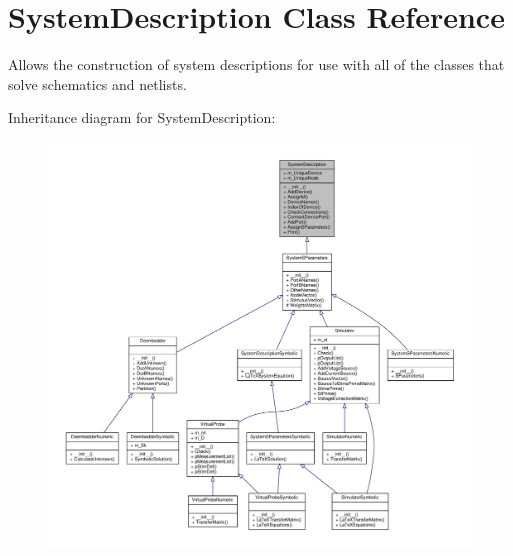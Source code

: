 \hypertarget{classSignalIntegrity_1_1SystemDescriptions_1_1SystemDescription_1_1SystemDescription}{}\section{System\+Description Class Reference}
\label{classSignalIntegrity_1_1SystemDescriptions_1_1SystemDescription_1_1SystemDescription}


Allows the construction of system descriptions for use with all of the classes that solve schematics and netlists.  




Inheritance diagram for System\+Description\+:\nopagebreak
\begin{figure}[H]
\begin{center}
\leavevmode
\includegraphics[width=350pt]{classSignalIntegrity_1_1SystemDescriptions_1_1SystemDescription_1_1SystemDescription__inherit__graph}
\end{center}
\end{figure}


